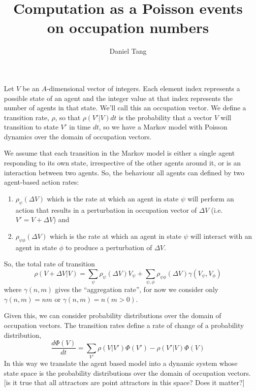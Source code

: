 \documentclass[a4paper]{article}
\title{Computation as a Poisson events on occupation numbers}
\author{Daniel Tang}
\begin{document}
\maketitle

Let $V$ be an $A$-dimensional vector of integers. Each element index represents a possible state of an agent and the integer value at that index represents the number of agents in that state. We'll call this an occupation vector. We define a transition rate, $\rho$, so that $\rho(V'|V)dt$ is the probability that a vector $V$ will transition to state $V'$ in time $dt$, so we have a Markov model with Poisson dynamics over the domain of occupation vectors.

We assume that each transition in the Markov model is either a single agent responding to its own state, irrespective of the other agents around it, or is an interaction between two agents. So, the behaviour all agents can defined by two agent-based action rates:
\begin{enumerate}
	\item $\rho_\psi(\Delta V)$ which is the rate at which an agent in state $\psi$ will perform an action that results in a perturbation in occupation vector of $\Delta V$ (i.e. $V' = V + \Delta V$) and
	\item $\rho_{\psi\phi}(\Delta V)$ which is the rate at which an agent in state $\psi$ will interact with an agent in state $\phi$ to produce a perturbation of $\Delta V$. 
\end{enumerate}

So, the total rate of transition 
\begin{equation}
\rho(V + \Delta V|V) = \sum_{\psi}  \rho_\psi(\Delta V) V_\psi + \sum_{\psi,\phi}  \rho_{\psi\phi}(\Delta V) \gamma(V_\psi,V_\phi)
\label{rateEq}
\end{equation}
where $\gamma(n,m)$ gives the ``aggregation rate'', for now we consider only $\gamma(n,m) = nm$ or $\gamma(n,m) = n(m>0)$.

Given this, we can consider probability distributions over the domain of occupation vectors. The transition rates define a rate of change of a probability distribution,
\begin{equation}
\frac{d\Phi(V)}{dt} = \sum_{V'} \rho(V|V')\Phi(V') - \rho(V'|V)\Phi(V)
\label{changeEq}
\end{equation}
In this way we translate the agent based model into a dynamic system whose state space is the probability distributions over the domain of occupation vectors. [is it true that all attractors are point attractors in this space? Does it matter?]
\end{document}
